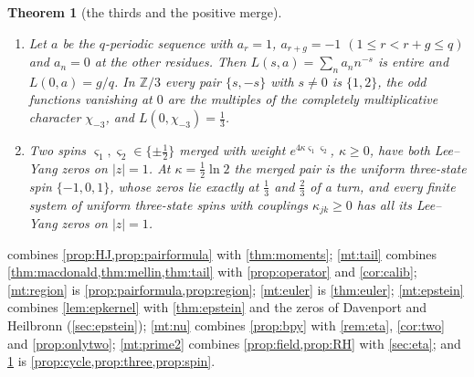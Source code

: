 \documentclass[11pt]{article}
\newtheorem{theorem}{Theorem}[section]
\theoremstyle{definition}\newtheorem{definition}[theorem]{Definition}
\theoremstyle{remark}\newtheorem{remark}[theorem]{Remark}
\begin{document}
\begin{theorem}[the thirds and the positive merge]\label{mt:thirds}
\begin{enumerate}[label=(\roman*)]
\item Let $a$ be the $q$-periodic sequence with $a_r=1$, $a_{r+g}=-1$ $(1\le r<r+g\le q)$ and $a_n=0$ at the other residues. Then $L(s,a)=\sum_na_nn^{-s}$ is entire and $L(0,a)=g/q$. In $\mathbb Z/3$ every pair $\{s,-s\}$ with $s\ne0$ is $\{1,2\}$, the odd functions vanishing at $0$ are the multiples of the completely multiplicative character $\chi_{-3}$, and $L(0,\chi_{-3})=\frac13$.
\item Two spins $\varsigma_1,\varsigma_2\in\{\pm\frac12\}$ merged with weight $e^{4\kappa\varsigma_1\varsigma_2}$, $\kappa\ge0$, have both Lee--Yang zeros on $|z|=1$. At $\kappa=\frac12\ln2$ the merged pair is the uniform three-state spin $\{-1,0,1\}$, whose zeros lie exactly at $\frac13$ and $\frac23$ of a turn, and every finite system of uniform three-state spins with couplings $\kappa_{jk}\ge0$ has all its Lee--Yang zeros on $|z|=1$.
\end{enumerate}
\end{theorem}

 combines \cref{prop:HJ,prop:pairformula} with \cref{thm:moments}; \cref{mt:tail} combines \cref{thm:macdonald,thm:mellin,thm:tail} with \cref{prop:operator} and \cref{cor:calib}; \cref{mt:region} is \cref{prop:pairformula,prop:region}; \cref{mt:euler} is \cref{thm:euler}; \cref{mt:epstein} combines \cref{lem:epkernel} with \cref{thm:epstein} and the zeros of Davenport and Heilbronn (\cref{sec:epstein}); \cref{mt:nu} combines \cref{prop:bpy} with \cref{rem:eta}, \cref{cor:two} and \cref{prop:onlytwo}; \cref{mt:prime2} combines \cref{prop:field,prop:RH} with \cref{sec:eta}; and \cref{mt:thirds} is \cref{prop:cycle,prop:three,prop:spin}.
\end{document}
